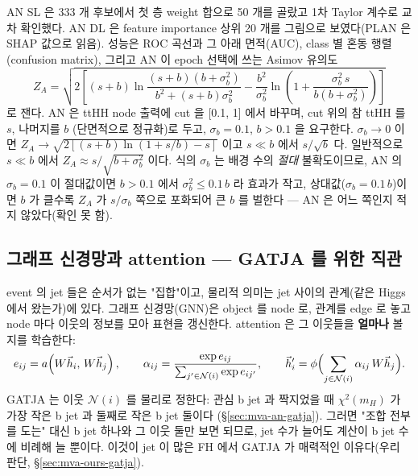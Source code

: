 AN SL 은 333 개 후보에서 첫 층 weight 합으로 50 개를 골랐고 1차 Taylor 계수로 교차 확인했다.
AN DL 은 feature importance 상위 20 개를 그림으로 보였다(PLAN 은 SHAP 값으로 읽음).
성능은 ROC 곡선과 그 아래 면적(AUC), class 별 혼동 행렬(confusion matrix), 그리고 AN 이 epoch 선택에 쓰는 Asimov 유의도
\begin{equation}
  Z_A=\sqrt{2\left[(s+b)\ln\frac{(s+b)(b+\sigma_b^2)}{b^2+(s+b)\sigma_b^2}-\frac{b^2}{\sigma_b^2}\ln\!\left(1+\frac{\sigma_b^2\,s}{b(b+\sigma_b^2)}\right)\right]}
  \label{eq:mva-za}
\end{equation}
로 잰다. AN 은 ttHH node 출력에 cut 을 [0.1, 1] 에서 바꾸며, cut 위의 참 ttHH 를 $s$, 나머지를 $b$
(단면적으로 정규화)로 두고, $\sigma_b=0.1$, $b>0.1$ 을 요구한다. $\sigma_b\to0$ 이면
$Z_A\to\sqrt{2[(s+b)\ln(1+s/b)-s]}$ 이고 $s\ll b$ 에서 $s/\sqrt{b}$ 다. 일반적으로 $s\ll b$ 에서 $Z_A\approx s/\sqrt{b+\sigma_b^2}$ 이다.
식의 $\sigma_b$ 는 배경 수의 \emph{절대} 불확도이므로, AN 의 $\sigma_b=0.1$ 이 절대값이면 $b>0.1$ 에서 $\sigma_b^2\le0.1\,b$ 라 효과가 작고,
상대값($\sigma_b=0.1\,b$)이면 $b$ 가 클수록 $Z_A$ 가 $s/\sigma_b$ 쪽으로 포화되어 큰 $b$ 를 벌한다 — AN 은 어느 쪽인지 적지 않았다(확인 못 함).

\subsection{그래프 신경망과 attention — GATJA 를 위한 직관}\label{sec:mva-basics-gnn}

event 의 jet 들은 순서가 없는 "집합"이고, 물리적 의미는 jet 사이의 관계(같은 Higgs 에서 왔는가)에 있다. 그래프 신경망(GNN)은 object 를
node 로, 관계를 edge 로 놓고 node 마다 이웃의 정보를 모아 표현을 갱신한다. attention 은 그 이웃들을 \textbf{얼마나} 볼지를 학습한다:
\begin{equation}
  e_{ij}=a\!\left(W\vec h_i,\,W\vec h_j\right),\qquad
  \alpha_{ij}=\frac{\exp e_{ij}}{\sum_{j'\in\mathcal{N}(i)}\exp e_{ij'}},\qquad
  \vec h_i'=\phi\Bigl(\sum_{j\in\mathcal{N}(i)}\alpha_{ij}\,W\vec h_j\Bigr).
  \label{eq:mva-gat}
\end{equation}
GATJA 는 이웃 $\mathcal{N}(i)$ 를 물리로 정한다: 관심 b jet 과 짝지었을 때 $\chi^2(m_H)$ 가 가장 작은 b jet 과 둘째로 작은 b jet 둘이다
(\S\ref{sec:mva-an-gatja}). 그러면 "조합 전부를 도는" 대신 b jet 하나와 그 이웃 둘만 보면 되므로, jet 수가 늘어도 계산이 b jet 수에
비례해 늘 뿐이다. 이것이 jet 이 많은 FH 에서 GATJA 가 매력적인 이유다(우리 판단, \S\ref{sec:mva-ours-gatja}).

